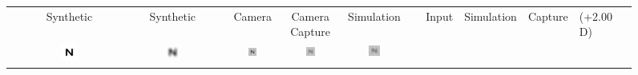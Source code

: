 
\begin{figure}[!b]
	\centering

	\begin{tabular}{@{}r@{ } c@{ } c@{ } c@{ } c@{ } c }
	&
	\small{Synthetic} &
	\small{Synthetic } &
	\small{Camera} &
	\small{Camera Capture} &
	\small{Simulation} & 
	&
	\small{Input} &
	\small{Simulation} &
	\small{Capture} &
	\small{(+2.00 D)} &
	\small{} & \\

	\begin{sideways} \parbox[b]{20mm} {} \end{sideways} &
	\includegraphics[width=0.185\textwidth]{__Images/05/WB_NCKZO_myopia/wb_N_20-200_Sloan@4x} &
	\includegraphics[width=0.185\textwidth]{__Images/05/WB_NCKZO_myopia/wb_N_20-200_Sloan@4x+2,00D(simulated)} &
	\includegraphics[width=0.185\textwidth]{__Images/05/WB_NCKZO_myopia/wb_N_20-200_Camera+0,00D} &
	\includegraphics[width=0.185\textwidth]{__Images/05/WB_NCKZO_myopia/wb_N_20-200_Camera+2,00D(lens)} &
	\includegraphics[width=0.185\textwidth]{__Images/05/WB_NCKZO_myopia/wb_N_20-200_Camera+2,00D(simulated)} \\


\end{tabular}
\end{figure}
